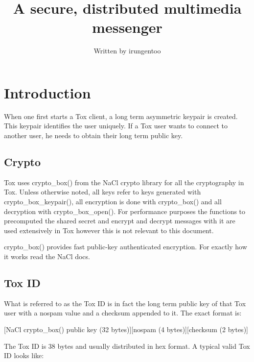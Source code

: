 \documentclass{tox}
\begin{document}
\title{A secure, distributed multimedia messenger}


\author{Written by irungentoo} %

\maketitle

\tableofcontents
\clearpage

\section{Introduction}

When one first starts a Tox client, a long term asymmetric keypair is created. 
This keypair identifies the user uniquely. If a Tox user wants to connect to 
another user, he needs to obtain their long term public key. 

\subsection{Crypto}

Tox uses crypto\_box() from the NaCl crypto library for all the cryptography in 
Tox. Unless otherwise noted, all keys refer to keys generated with 
crypto\_box\_keypair(), all encryption is done with crypto\_box() and all 
decryption with crypto\_box\_open(). For performance purposes the functions to 
precomputed the shared secret and encrypt and decrypt messages with it are used 
extensively in Tox however this is not relevant to this document.

crypto\_box() provides fast public-key authenticated encryption. For exactly 
how it works read the NaCl docs.

\subsection{Tox ID}

What is referred to as the Tox ID is in fact the long term public key of that 
Tox user with a nospam value and a checksum appended to it. The exact format is:

[NaCl crypto\_box() public key (32 bytes)][nospam (4 bytes)][checksum (2 bytes)]

The Tox ID is 38 bytes and usually distributed in hex format. A typical valid 
Tox ID looks like:
\end{document}
